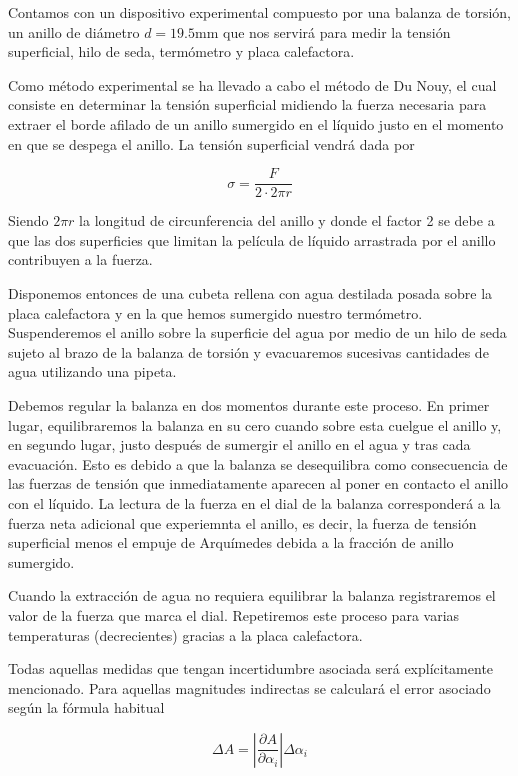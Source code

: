 Contamos con un dispositivo experimental compuesto por una balanza de torsión, un anillo de diámetro $d = 19.5$mm que nos servirá para medir la tensión superficial, hilo de seda, termómetro y placa calefactora.

Como método experimental se ha llevado a cabo el método de Du Nouy, el cual consiste en determinar la tensión superficial midiendo la fuerza necesaria para extraer el borde afilado de un anillo sumergido en el líquido justo en el momento en que se despega el anillo. La tensión superficial vendrá dada por

\begin{equation}
	\sigma = \frac{F}{2 \cdot 2\pi r} \label{eq_nouy}
\end{equation}

Siendo $2\pi r$ la longitud de circunferencia del anillo y donde el factor 2 se debe a que las dos superficies que limitan la película de líquido arrastrada por el anillo contribuyen a la fuerza.

Disponemos entonces de una cubeta rellena con agua destilada posada sobre la placa calefactora y en la que hemos sumergido nuestro termómetro. Suspenderemos el anillo sobre la superficie del agua por medio de un hilo de seda sujeto al brazo de la balanza de torsión y evacuaremos sucesivas cantidades de agua utilizando una pipeta. 

Debemos regular la balanza en dos momentos durante este proceso. En primer lugar, equilibraremos la balanza en su cero cuando sobre esta cuelgue el anillo y, en segundo lugar, justo después de sumergir el anillo en el agua y tras cada evacuación. Esto es debido a que la balanza se desequilibra como consecuencia de las fuerzas de tensión que inmediatamente aparecen al poner en contacto el anillo con el líquido. La lectura de la fuerza en el dial de la balanza corresponderá a la fuerza neta adicional que experiemnta el anillo, es decir, la fuerza de tensión superficial menos el empuje de Arquímedes debida a la fracción de anillo sumergido.

Cuando la extracción de agua no requiera equilibrar la balanza registraremos el valor de la fuerza que marca el dial. Repetiremos este proceso para varias temperaturas (decrecientes) gracias a la placa calefactora.

Todas aquellas medidas que tengan incertidumbre asociada será explícitamente mencionado. Para aquellas magnitudes indirectas se calculará el error asociado según la fórmula habitual

\begin{equation}
	\Delta{A} = |\frac{\partial A}{\partial \alpha_i}|\Delta \alpha_i
\end{equation}